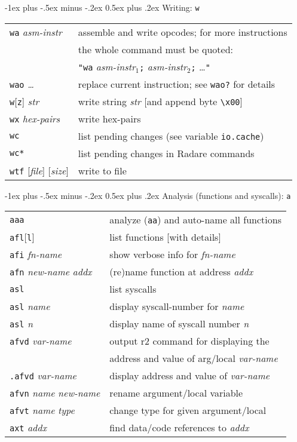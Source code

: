 \documentclass[a4paper,landscape]{article}
\makeatletter
\renewcommand{\section}{\@startsection{section}{1}{0mm}%
                                {-1ex plus -.5ex minus -.2ex}%
                                {0.5ex plus .2ex}%
                                {\normalfont\large\bfseries}}
\makeatother
\begin{document}
\begin{multicols*}{3}
\section{Writing: \texttt{w}}
\begin{tabular}{@{}ll@{}}
\texttt{wa} \textit{asm-instr} & assemble and write opcodes; for more instructions \\ &
	the whole command must be quoted: \\ &
\texttt{"wa} \textit{asm-instr$_1$}\texttt{;} \textit{asm-instr$_2$}\texttt{;} \ldots\texttt{"} \\
\texttt{wao} \textit{\ldots} & replace current instruction; see \texttt{wao?} for details \\
\texttt{w}[\texttt{z}] \textit{str} & write string \textit{str} [and append byte \texttt{\textbackslash x00}] \\
\texttt{wx} \textit{hex-pairs} & write hex-pairs \\
\texttt{wc} & list pending changes (see variable \texttt{io.cache}) \\
\texttt{wc*} & list pending changes in Radare commands \\
\texttt{wtf} [\textit{file}] [\textit{size}] & write to file \\
\end{tabular}

\section{Analysis (functions and syscalls): \texttt{a}}
\begin{tabular}{@{}ll@{}}
\texttt{aaa} & analyze (\texttt{aa}) and auto-name all functions \\
\texttt{afl}[\texttt{l}] & list functions [with details] \\
\texttt{afi} \textit{fn-name} & show verbose info for \textit{fn-name} \\
\texttt{afn} \textit{new-name} \textit{addx} & (re)name function at address \textit{addx} \\
\texttt{asl} & list syscalls \\
\texttt{asl} \textit{name} & display syscall-number for \textit{name} \\
\texttt{asl} \textit{n} & display name of syscall number \textit{n} \\
\texttt{afvd} \textit{var-name} & output r2 command for displaying the \\ & address and value of arg/local \textit{var-name} \\
\texttt{.afvd} \textit{var-name} & display address and value of \textit{var-name} \\
\texttt{afvn} \textit{name} \textit{new-name} & rename argument/local variable \\
\texttt{afvt} \textit{name} \textit{type} & change type for given argument/local \\
\texttt{axt} \textit{addx} & find data/code references to \textit{addx} \\
\end{tabular}

\end{multicols*}
\end{document}
